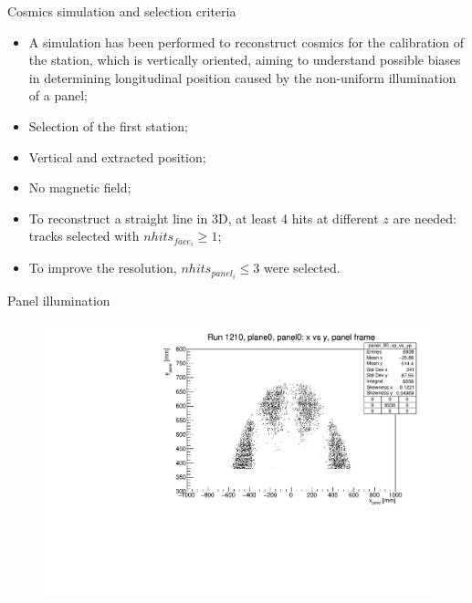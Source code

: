 \documentclass{beamer}[10pt]
\begin{document}
\begin{frame}{Cosmics simulation and selection criteria}
  \begin{itemize}
    \item 
    A simulation has been performed to reconstruct cosmics for the calibration of the station, which is vertically oriented, 
    aiming to understand possible biases in determining longitudinal position caused by the non-uniform illumination of a panel;
    \vspace{3mm}
    \item Selection of the first station;
    \vspace{3mm}
    \item Vertical and extracted position;
    \vspace{3mm}
    \item No magnetic field;
    \vspace{3mm}
    \item To reconstruct a straight line in 3D, at least 4 hits at different $z$ are needed: tracks selected with $nhits_{face_i}\geq 1$;
    \vspace{3mm}
    \item To improve the resolution, $nhits_{panel_i}\leq 3$ were selected.
  \end{itemize}
\end{frame}
\begin{frame}{Panel illumination}
   
            \begin{figure}[H]
                \centering
                \includegraphics[width=0.8 \textwidth]{figures/pdf/xp_vs_yp_panel0.pdf}
                \label{fig:enter-label}
            \end{figure}

\end{frame}
\end{document}
